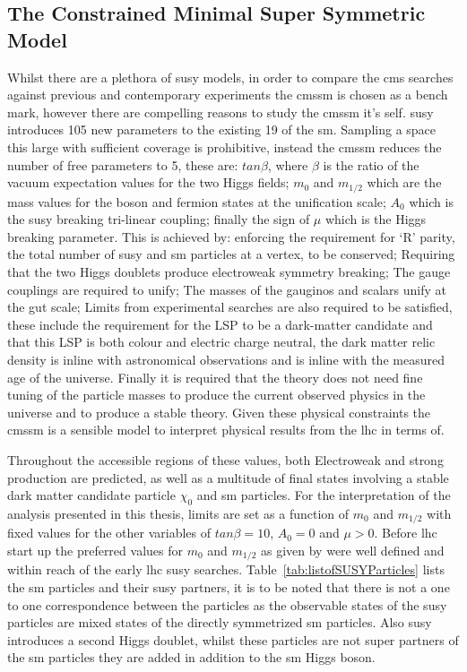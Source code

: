 \subsection{The Constrained Minimal Super Symmetric Model} %
\label{sec:the_constrained_minimal_super_symmetric_model}
Whilst there are a plethora of \ac{susy} models, in order to compare the 
\ac{cms} searches against previous and contemporary experiments the 
\ac{cmssm} is chosen as a bench mark, however there are 
compelling reasons to study the \ac{cmssm} it's self. \ac{susy} introduces 105 
new parameters to the existing 19 of the \ac{sm}. Sampling a space 
this large with sufficient coverage is prohibitive, instead the \ac{cmssm} 
reduces the number of free parameters to 5, these are: $tan \beta$, where 
$\beta$ is the ratio of the vacuum expectation values for the two Higgs fields; 
$m_{0}$ and $m_{1/2}$ which are the mass values for the boson and fermion 
states at the unification scale; $A_{0}$ which is the \ac{susy} breaking 
tri-linear coupling; finally the sign of $\mu$ which is the Higgs breaking 
parameter. This is achieved by: enforcing the requirement for `R' parity, the  
total number of \ac{susy} and \ac{sm} particles at a vertex, to be conserved; 
Requiring that the two Higgs doublets produce electroweak symmetry breaking; 
The gauge couplings are required to unify; The masses of the gauginos and 
scalars unify at the \ac{gut} scale; Limits from experimental searches are also 
required to be satisfied, these include the requirement for the LSP to be a 
dark-matter candidate and that this LSP is both colour and electric charge 
neutral, the dark matter relic density is inline with astronomical observations 
and is inline with the measured age of the universe. Finally it is required 
that the theory does not need fine tuning of the particle masses to produce the 
current observed physics in the universe and to produce a stable theory.
Given these physical constraints the \ac{cmssm} is a sensible model to 
interpret physical results from the \ac{lhc} in terms of.


Throughout the accessible regions of these values, both Electroweak and 
strong production are predicted, as well as a multitude of final states 
involving a stable dark matter candidate particle $\chi_{0}$ and \ac{sm} 
particles. For the interpretation of the analysis presented in this thesis, 
limits are set as a function of $m_{0}$ and $m_{1/2}$ with fixed values for the 
other variables of $tan \beta = 10$, $A_{0} = 0$ and $\mu > 0$.
Before \ac{lhc} start up the preferred values for $m_{0}$ and $m_{1/2}$ as 
given by  were well defined and within reach of the 
early \ac{lhc} \ac{susy} searches.
Table~\ref{tab:listofSUSYParticles} lists the \ac{sm} particles and their 
\ac{susy} partners, it is to be noted that there is not a one to one 
correspondence between the particles as the observable states of the \ac{susy} 
particles are mixed states of the directly symmetrized \ac{sm} particles. Also 
\ac{susy} introduces a second Higgs doublet, whilst these particles are not 
super partners of the \ac{sm} particles they are added in addition to the 
\ac{sm} Higgs boson.


